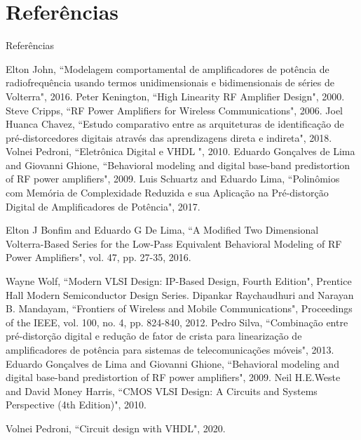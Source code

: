 \documentclass{if-beamer}
\begin{document}
\section*{Referências}
\begin{frame}{Referências}
	
		\begin{thebibliography}{}
		 Elton John, ``Modelagem comportamental de amplificadores de potência de radiofrequência usando termos unidimensionais e bidimensionais de séries de Volterra", 2016.
		 Peter Kenington, ``High Linearity RF Amplifier Design", 2000.
		 Steve Cripps, ``RF Power Amplifiers for Wireless Communications", 2006.
		 Joel Huanca Chavez, ``Estudo comparativo entre as arquiteturas de identificação de pré-distorcedores digitais através das aprendizagens direta e indireta", 2018.
		 Volnei Pedroni, ``Eletrônica Digital e VHDL ", 2010.
		 Eduardo Gonçalves de Lima and Giovanni Ghione, ``Behavioral modeling and digital base-band predistortion of RF power amplifiers", 2009.
		 Luis Schuartz and Eduardo Lima, ``Polinômios com Memória de Complexidade Reduzida e sua Aplicação na Pré-distorção Digital de Amplificadores de Potência", 2017.
		
		 Elton J Bonfim and Eduardo G De Lima, ``A Modified Two Dimensional Volterra-Based Series for the Low-Pass Equivalent Behavioral Modeling of RF Power Amplifiers", vol. 47, pp. 27-35, 2016.
		
		 Wayne Wolf, ``Modern VLSI Design: IP-Based Design, Fourth Edition", Prentice Hall Modern Semiconductor Design Series.
		 Dipankar Raychaudhuri and Narayan B. Mandayam, ``Frontiers of Wireless and Mobile Communications", Proceedings of the IEEE, vol. 100, no. 4, pp. 824-840, 2012.
		 Pedro Silva, ``Combinação entre pré-distorção digital e redução de fator de crista para linearização de amplificadores de potência para sistemas de telecomunicações móveis", 2013.
		 Eduardo Gonçalves de Lima and Giovanni Ghione, ``Behavioral modeling and digital base-band predistortion of RF power amplifiers", 2009.
		 Neil H.E.Weste and David Money Harris, ``CMOS VLSI Design: A Circuits and Systems Perspective (4th Edition)", 2010.
		
		 Volnei Pedroni, ``Circuit design with VHDL", 2020.
	\end{thebibliography}

\end{frame}


\end{document}
